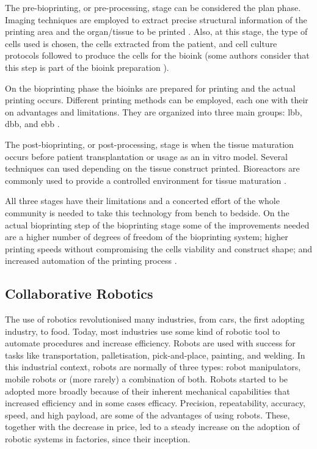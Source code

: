 The pre-bioprinting, or pre-processing, stage can be considered the plan phase. Imaging techniques are employed to extract precise structural information of the printing area and the organ/tissue to be printed \cite{Datta2018_essential_steps_bioprinting, Vijayavenkataraman2018_bioprinting_tissues_organs_regen_med}. Also, at this stage, the type of cells used is chosen, the cells extracted from the patient, and cell culture protocols followed to produce the cells for the bioink (some authors consider that this step is part of the bioink preparation \cite{Vijayavenkataraman2018_bioprinting_tissues_organs_regen_med}). 

On the bioprinting phase the bioinks are prepared for printing and the actual printing occurs. Different printing methods can be employed, each one with their on advantages and limitations. They are organized into three main groups: \gls{lbb}, \gls{dbb}, and \gls{ebb} \cite{Datta2018_essential_steps_bioprinting, Vijayavenkataraman2018_bioprinting_tissues_organs_regen_med}. 

The post-bioprinting, or post-processing, stage is when the tissue maturation occurs before patient transplantation or usage as an in vitro model. Several techniques can used depending on the tissue construct printed. Bioreactors are commonly used to provide a controlled environment for tissue maturation \cite{Datta2018_essential_steps_bioprinting, Vijayavenkataraman2018_bioprinting_tissues_organs_regen_med}.

All three stages have their limitations and a concerted effort of the whole community is needed to take this technology from bench to bedside. On the actual bioprinting step of the bioprinting stage some of the improvements needed are a higher number of degrees of freedom of the bioprinting system; higher printing speeds without compromising the cells viability and construct shape; and increased automation of the printing process \cite{Ozbolat2017_evaluation_bioprinter_tech, Datta2018_essential_steps_bioprinting}.


\subsection{Collaborative Robotics} %
\label{subsec:collaborative_robotics}

The use of robotics revolutionised many industries, from cars, the first adopting industry, to food. Today, most industries use some kind of robotic tool to automate procedures and increase efficiency. Robots are used with success for tasks like transportation, palletisation, pick-and-place, painting, and welding. In this industrial context, robots are normally of three types: robot manipulators, mobile robots or (more rarely) a combination of both. Robots started to be adopted more broadly because of their inherent mechanical capabilities that increased efficiency and in some cases efficacy. Precision, repeatability, accuracy, speed, and high payload, are some of the advantages of using robots. These, together with the decrease in price, led to a steady increase on the adoption of robotic systems in factories, since their inception.


